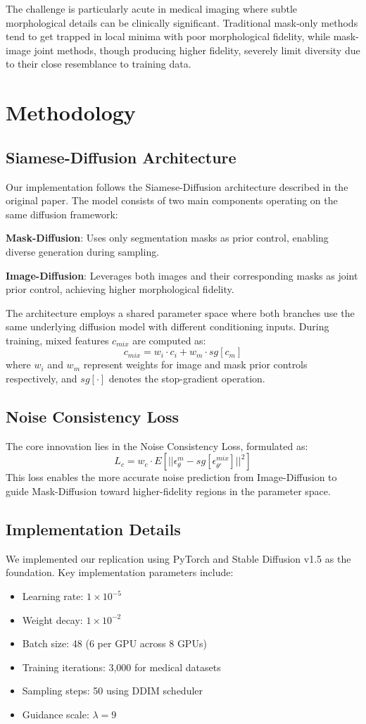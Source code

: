 \documentclass[conference]{IEEEtran}
\begin{document}
The challenge is particularly acute in medical imaging where subtle morphological details can be clinically significant. Traditional mask-only methods tend to get trapped in local minima with poor morphological fidelity, while mask-image joint methods, though producing higher fidelity, severely limit diversity due to their close resemblance to training data.

\section{Methodology}

\subsection{Siamese-Diffusion Architecture}
Our implementation follows the Siamese-Diffusion architecture described in the original paper. The model consists of two main components operating on the same diffusion framework:

\textbf{Mask-Diffusion}: Uses only segmentation masks as prior control, enabling diverse generation during sampling.

\textbf{Image-Diffusion}: Leverages both images and their corresponding masks as joint prior control, achieving higher morphological fidelity.

The architecture employs a shared parameter space where both branches use the same underlying diffusion model with different conditioning inputs. During training, mixed features $c_{mix}$ are computed as:
$$c_{mix} = w_i \cdot c_i + w_m \cdot sg[c_m]$$
where $w_i$ and $w_m$ represent weights for image and mask prior controls respectively, and $sg[\cdot]$ denotes the stop-gradient operation.

\subsection{Noise Consistency Loss}
The core innovation lies in the Noise Consistency Loss, formulated as:
$$L_c = w_c \cdot E[||\epsilon^m_\theta - sg[\epsilon^{mix}_{\theta'}]||^2]$$
This loss enables the more accurate noise prediction from Image-Diffusion to guide Mask-Diffusion toward higher-fidelity regions in the parameter space.

\subsection{Implementation Details}
We implemented our replication using PyTorch and Stable Diffusion v1.5 as the foundation. Key implementation parameters include:
\begin{itemize}
    \item Learning rate: $1 \times 10^{-5}$
    \item Weight decay: $1 \times 10^{-2}$
    \item Batch size: 48 (6 per GPU across 8 GPUs)
    \item Training iterations: 3,000 for medical datasets
    \item Sampling steps: 50 using DDIM scheduler
    \item Guidance scale: $\lambda = 9$
\end{itemize}
\end{document}
